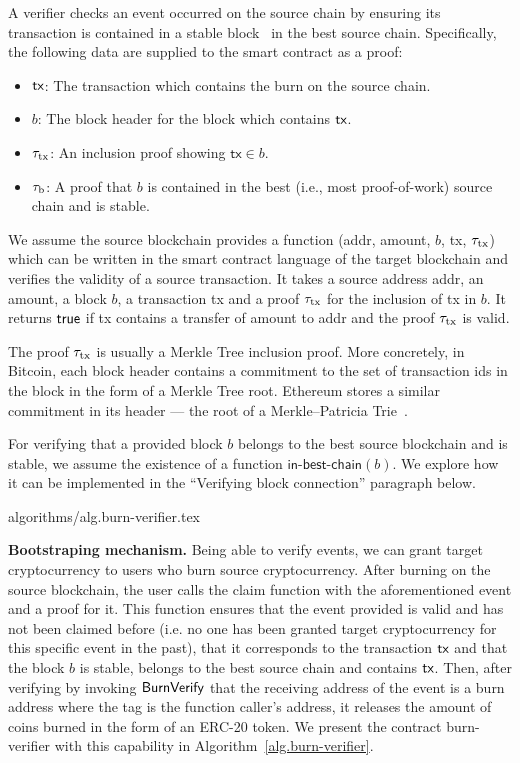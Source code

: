 A verifier checks an event occurred on the source chain by ensuring its transaction is contained in a stable block~\cite{EC:GarKiaLeo15,C:GarKiaLeo17} in the best source chain. Specifically, the following data are supplied to the smart contract as a proof:

\begin{itemize}
  \item $\textsf{tx}$: The transaction which contains the burn on the source chain.
  \item $b$: The block header for the block which contains $\textsf{tx}$.
  \item $\tau_\text{tx}$: An inclusion proof showing $\mathsf{tx} \in b$.
  \item $\tau_\text{b}$: A proof that $b$ is contained in the best (i.e., most proof-of-work) source chain and is stable.
\end{itemize}

We assume the source blockchain provides a function \verifytx(\textsf{addr}, \textsf{amount}, $b$, \textsf{tx}, $\tau_\text{tx}$) which can be written in the smart contract language of the target blockchain and verifies the validity of a source transaction. It takes a source address \textsf{addr}, an \textsf{amount}, a block $b$, a transaction \textsf{tx} and a proof $\tau_\text{tx}$ for the inclusion of \textsf{tx} in $b$. It returns $\mathsf{true}$ if \textsf{tx} contains a transfer of \textsf{amount} to \textsf{addr} and the proof $\tau_\text{tx}$ is valid.

The proof $\tau_\text{tx}$ is usually a Merkle Tree inclusion proof. More concretely, in Bitcoin, each block header contains a commitment to the set of transaction ids in the block in the form of a Merkle Tree root. Ethereum stores a similar commitment in its header --- the root of a Merkle--Patricia Trie~\cite{wood2014ethereum}.

For verifying that a provided block $b$ belongs to the best source blockchain and is stable, we assume the existence of a function $\textsf{in-best-chain}(b)$. We explore how it can be implemented in the ``Verifying block connection'' paragraph below.

{algorithms/alg.burn-verifier.tex}

\noindent
\textbf{Bootstraping mechanism.}
Being able to verify events, we can grant target cryptocurrency to users who burn source cryptocurrency. After burning on the source blockchain, the user calls the \textsf{claim} function with the aforementioned event and a proof for it. This function ensures that the event provided is valid and has not been claimed before (i.e. no one has been granted target cryptocurrency for this specific event in the past), that it corresponds to the transaction $\textsf{tx}$ and that the block $b$ is stable, belongs to the best source chain and contains $\textsf{tx}$. Then, after verifying by invoking $\mathsf{BurnVerify}$ that the receiving address of the event is a burn address where the tag is the function caller's address, it releases the amount of coins burned in the form of an ERC-20 token. We present the contract \textsf{burn-verifier} with this capability in Algorithm~\ref{alg.burn-verifier}.


